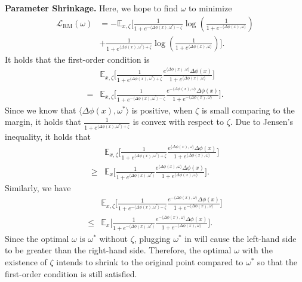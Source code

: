 \textbf{Parameter Shrinkage.} Here, we hope to find $\omega$ to minimize
\begin{align}\label{eq:est_beta}
\mathcal{L}_{\mathrm{RM}}(\omega)&=-\mathbb{E}_{x,\zeta} \Big[\frac{1}{1+e^{-\langle\Delta\phi(x),\omega^*\rangle-\zeta}}\log(\frac{1}{1+e^{-\langle\Delta\phi(x),\omega\rangle}})\nonumber\\
&+\frac{1}{1+e^{\langle\Delta\phi(x),\omega^*\rangle+\zeta}}\log(\frac{1}{1+e^{\langle\Delta\phi(x),\omega\rangle}})\Big].
\end{align}
It holds that the first-order condition is 
\begin{align}
   & \mathbb{E}_{x,\zeta}\Big[\frac{1}{1+e^{\langle\Delta\phi(x),\omega^*\rangle+\zeta}}\frac{e^{\langle\Delta\phi(x),\omega\rangle}\Delta\phi(x)}{1+e^{\langle\Delta\phi(x),\omega\rangle}}\Big]\nonumber\\
    =& \mathbb{E}_{x,\zeta}\Big[\frac{1}{1+e^{-\langle\Delta\phi(x),\omega^*\rangle-\zeta}}\frac{e^{-\langle\Delta\phi(x),\omega\rangle}\Delta\phi(x)}{1+e^{-\langle\Delta\phi(x),\omega\rangle}}\Big].
    \label{eq:FOC}
\end{align}
Since we know that $\langle \Delta\phi(x),\omega^*\rangle$ is positive, when $\zeta$ is small comparing to the margin, it holds that $\frac{1}{1+e^{\langle\Delta\phi(x),\omega^*\rangle+\zeta}}$ is convex with respect to $\zeta$. Due to Jensen's inequality, it holds that 
\begin{align*}
    &\mathbb{E}_{x,\zeta}\Big[\frac{1}{1+e^{\langle\Delta\phi(x),\omega^*\rangle+\zeta}}\frac{e^{\langle\Delta\phi(x),\omega\rangle}\Delta\phi(x)}{1+e^{\langle\Delta\phi(x),\omega\rangle}}\Big]
    \\
    \ge& \mathbb{E}_{x}\Big[\frac{1}{1+e^{\langle\Delta\phi(x),\omega^*\rangle}}\frac{e^{\langle\Delta\phi(x),\omega\rangle}\Delta\phi(x)}{1+e^{\langle\Delta\phi(x),\omega\rangle}}\Big].
\end{align*}
Similarly, we have 
\begin{align*}
    &\mathbb{E}_{x,\zeta}\Big[\frac{1}{1+e^{-\langle\Delta\phi(x),\omega^*\rangle-\zeta}}\frac{e^{-\langle\Delta\phi(x),\omega\rangle}\Delta\phi(x)}{1+e^{-\langle\Delta\phi(x),\omega\rangle}}\Big]
    \\
    \le& \mathbb{E}_{x}\Big[\frac{1}{1+e^{-\langle\Delta\phi(x),\omega^*\rangle}}\frac{e^{-\langle\Delta\phi(x),\omega\rangle}\Delta\phi(x)}{1+e^{-\langle\Delta\phi(x),\omega\rangle}}\Big].
\end{align*}
Since the optimal $\omega$ is $\omega^*$ without $\zeta$, plugging $\omega^*$ in  will cause the left-hand side to be greater than the right-hand side. Therefore,
the optimal $\omega$ with the existence of $\zeta$ intends to shrink to the original point compared to $\omega^*$ so that the first-order condition is still satisfied.  

